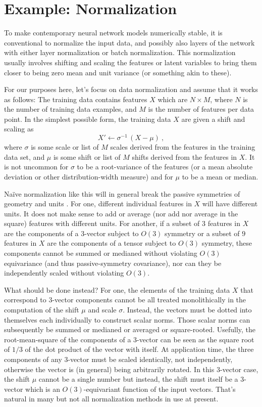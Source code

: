 \documentclass[accepted]{article}
\begin{document}
\section{Example: Normalization}\label{sec:norm}
To make contemporary neural network models numerically stable, it is conventional to normalize the input data, and possibly also layers of the network with either layer normalization or batch normalization.
This normalization usually involves shifting and scaling the features or latent variables to bring them closer to being zero mean and unit variance (or something akin to these).

For our purposes here, let's focus on data normalization and assume that it works as follows:
The training data contains features $X$ which are $N\times M$, where $N$ is the number of training data examples, and $M$ is the number of features per data point.
In the simplest possible form, the training data $X$ are given a shift and scaling as
\begin{equation} \label{eq.data-normalization}
    X' \leftarrow \sigma^{-1}\,(X - \mu) ~,
\end{equation}
where $\sigma$ is some scale or list of $M$ scales derived from the features in the training data set, and $\mu$ is some shift or list of $M$ shifts derived from the features in $X$.
It is not uncommon for $\sigma$ to be a root-variance of the features (or a mean absolute deviation or other distribution-width measure) and for $\mu$ to be a mean or median.

Na\"ive normalization like this will in general break the passive symmetries of geometry and units \citep{aalto2022geometric}.
For one, different individual features in $X$ will have different units.
It does not make sense to add or average (nor add nor average in the square) features with different units.
For another, if a subset of $3$ features in $X$ are the components of a 3-vector subject to $O(3)$ symmetry or a subset of $9$ features in $X$ are the components of a tensor subject to $O(3)$ symmetry, these components cannot be summed or medianed without violating $O(3)$ equivariance (and thus passive-symmetry covariance), nor can they be independently scaled without violating $O(3)$.

What should be done instead?
For one, the elements of the training data $X$ that correspond to 3-vector components cannot be all treated monolithically in the computation of the shift $\mu$ and scale $\sigma$.
Instead, the vectors must be dotted into themselves each individually to construct scalar norms.
Those scalar norms can subsequently be summed or medianed or averaged or square-rooted.
Usefully, the root-mean-square of the components of a 3-vector can be seen as the square root of $1/3$ of the dot product of the vector with itself.
At application time, the three components of any 3-vector must be scaled identically, not independently, otherwise the vector is (in general) being arbitrarily rotated.
In this 3-vector case, the shift $\mu$ cannot be a single number but instead, the shift must itself be a 3-vector which is an $O(3)$-equivariant function of the input vectors.
That's natural in many but not all normalization methods in use at present.
\end{document}
